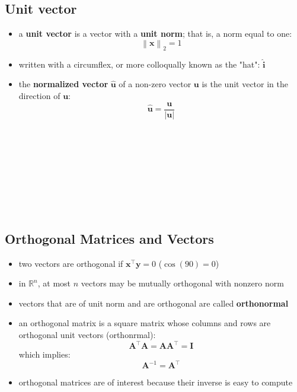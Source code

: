 \documentclass[11pt,twocolumn]{report}
\def\realnumbers{\mathbb{R}}
\newcommand{\norm}[1]{\left\lVert#1\right\rVert}
\begin{document}
\subsection{Unit vector}
\begin{itemize}
  \item a \textbf{unit vector} is a vector with a \textbf{unit norm}; that is,
    a norm equal to one:
    \begin{equation}
      \norm{\bm{x}}_2 = 1
    \end{equation}
  \item written with a circumflex, or more colloqually known as the "hat":
    $\hat{\bm{i}}$
  \item the \textbf{normalized vector} $\hat{\bm{u}}$ of a non-zero vector
    $\bm{u}$ is the unit vector in the direction of $\bm{u}$:
    \begin{equation}
      \hat{\bm{u}} = \frac{\bm{u}}{|\bm{u}|}
    \end{equation}
    \\
    \\
    \\
    \\
    \\
    \\
    \\
    \\
\end{itemize}
\subsection{Orthogonal Matrices and Vectors}
\begin{itemize}
  \item two vectors are orthogonal if $\bm{x}^\intercal\bm{y} = 0$ ($\cos(90) =
    0$)
  \item in $\realnumbers^n$, at most $n$ vectors may be mutually orthogonal
    with nonzero norm
  \item vectors that are of unit norm and are orthogonal are called
    \textbf{orthonormal}
  \item an orthogonal matrix is a square matrix whose columns and rows are
    orthogonal unit vectors (orthonrmal):
    \begin{equation}
      \bm{A}^\intercal\bm{A} = \bm{A}\bm{A}^\intercal = \bm{I}
    \end{equation}
    which implies:
    \begin{equation}
      \bm{A}^{-1} = \bm{A}^\intercal
    \end{equation}
  \item orthogonal matrices are of interest because their inverse is easy to
    compute
\end{itemize}
\end{document}
